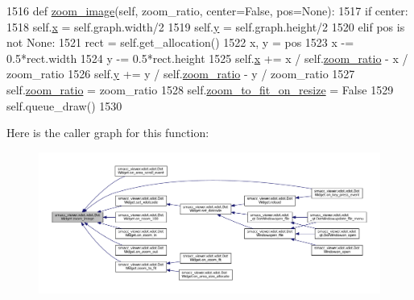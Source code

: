 \begin{DoxyCode}
1516     \textcolor{keyword}{def }\hyperlink{classsmacc__viewer_1_1xdot_1_1xdot_1_1DotWidget_a59e85f20fa9e43ffdeb3a3982061ca5d}{zoom\_image}(self, zoom\_ratio, center=False, pos=None):
1517         \textcolor{keywordflow}{if} center:
1518             self.\hyperlink{classsmacc__viewer_1_1xdot_1_1xdot_1_1DotWidget_a828aac52a08d67c493696b074b6326da}{x} = self.graph.width/2
1519             self.\hyperlink{classsmacc__viewer_1_1xdot_1_1xdot_1_1DotWidget_a1f5ee9fba6b3fe02772831d9bf6d7481}{y} = self.graph.height/2
1520         \textcolor{keywordflow}{elif} pos \textcolor{keywordflow}{is} \textcolor{keywordflow}{not} \textcolor{keywordtype}{None}:
1521             rect = self.get\_allocation()
1522             x, y = pos
1523             x -= 0.5*rect.width
1524             y -= 0.5*rect.height
1525             self.\hyperlink{classsmacc__viewer_1_1xdot_1_1xdot_1_1DotWidget_a828aac52a08d67c493696b074b6326da}{x} += x / self.\hyperlink{classsmacc__viewer_1_1xdot_1_1xdot_1_1DotWidget_a61694eba4278e9726bbef68a9ca3f594}{zoom\_ratio} - x / zoom\_ratio
1526             self.\hyperlink{classsmacc__viewer_1_1xdot_1_1xdot_1_1DotWidget_a1f5ee9fba6b3fe02772831d9bf6d7481}{y} += y / self.\hyperlink{classsmacc__viewer_1_1xdot_1_1xdot_1_1DotWidget_a61694eba4278e9726bbef68a9ca3f594}{zoom\_ratio} - y / zoom\_ratio
1527         self.\hyperlink{classsmacc__viewer_1_1xdot_1_1xdot_1_1DotWidget_a61694eba4278e9726bbef68a9ca3f594}{zoom\_ratio} = zoom\_ratio
1528         self.\hyperlink{classsmacc__viewer_1_1xdot_1_1xdot_1_1DotWidget_ab593e704812a8e15cde5ac909458fb91}{zoom\_to\_fit\_on\_resize} = \textcolor{keyword}{False}
1529         self.queue\_draw()
1530 
\end{DoxyCode}


Here is the caller graph for this function\+:
\nopagebreak
\begin{figure}[H]
\begin{center}
\leavevmode
\includegraphics[width=350pt]{classsmacc__viewer_1_1xdot_1_1xdot_1_1DotWidget_a59e85f20fa9e43ffdeb3a3982061ca5d_icgraph}
\end{center}
\end{figure}


